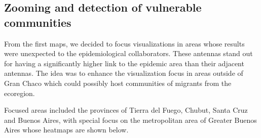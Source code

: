 \subsection{Zooming and detection of vulnerable communities}

From the first maps, we decided to focus visualizations in areas whose results were unexpected to the epidemiological collaborators. These antennas stand out for having a significantly higher link to the epidemic area than their adjacent antennas. The idea was to enhance the visualization focus in areas outside of Gran Chaco which could possibly host communities of migrants from the ecoregion.

Focused areas included the provinces of Tierra del Fuego, Chubut, Santa Cruz and Buenos Aires, with special focus on the metropolitan area of Greater Buenos Aires whose heatmaps are shown below.

